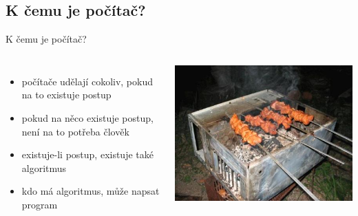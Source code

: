 \documentclass{beamer}
\begin{document}
\subsection{K čemu je počítač?}

\begin{frame}{K čemu je počítač?}
  \begin{columns}
    \begin{itemize}
      \item počítače udělají cokoliv, pokud na to existuje postup
      \item pokud na něco existuje postup, není na to potřeba člověk
      \item existuje-li postup, existuje také algoritmus
      \item kdo má algoritmus, může napsat program
    \end{itemize}
    \includegraphics[width=\columnwidth]{computerbarbie}
  \end{columns}
\end{frame}
\end{document}
